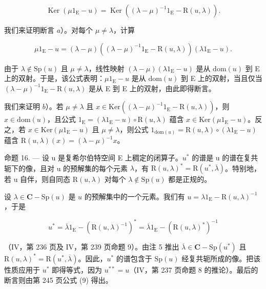 \[
\operatorname{Ker} \left(\mu 1 _ {\mathrm{E}} - u\right) = \operatorname{Ker} \left(\left(\lambda - \mu\right) ^ {- 1} 1 _ {\mathrm{E}} - \mathrm{R} (u, \lambda)\right).
\]

我们来证明断言 \(a\)）。对每个 \(\mu \neq \lambda\)，计算

\[
\mu 1 _ {\mathrm{E}} - u = (\lambda - \mu) ((\lambda - \mu) ^ {- 1} 1 _ {\mathrm{E}} - \mathrm{R} (u, \lambda)) (\lambda 1 _ {\mathrm{E}} - u).
\]

由于 \(\lambda \notin \mathrm{Sp}(u)\) 且 \(\mu \neq \lambda\)，线性映射 \((\lambda - \mu)(\lambda 1_{\mathrm{E}} - u)\) 是从 \(\mathrm{dom}(u)\) 到 E 上的双射。于是，该公式表明：\(\mu 1_{\mathrm{E}} - u\) 是从 \(\mathrm{dom}(u)\) 到 E 上的双射，当且仅当 \((\lambda - \mu)^{-1} 1_{\mathrm{E}} - \mathrm{R}(u, \lambda)\) 是从 E 到 E 上的双射，由此即得断言。

我们来证明 \(b\)）。若 \(\mu \neq \lambda\) 且 \(x \in \mathrm{Ker}((\lambda - \mu)^{-1}1_{\mathrm{E}} - \mathrm{R}(u, \lambda))\)，则 \(x \in \mathrm{dom}(u)\)，且公式 \(1_{\mathrm{E}} = (\lambda 1_{\mathrm{E}} - u) \circ \mathrm{R}(u, \lambda)\) 蕴含 \(x \in \mathrm{Ker}(\mu 1_{\mathrm{E}} - u)\)。反之，若 \(x \in \mathrm{Ker}(\mu 1_{\mathrm{E}} - u)\) 且 \(\mu \neq \lambda\)，则公式 \(1_{\mathrm{dom}(u)} = \mathrm{R}(u, \lambda) \circ (\lambda 1_{\mathrm{E}} - u)\) 蕴含 \(\mathrm{R}(u, \lambda)(x) = (\lambda - \mu)^{-1}x\)。

命题 16. --- 设 u 是复希尔伯特空间 E 上稠定的闭算子。\(u^{*}\) 的谱是 u 的谱在复共轭下的像，且对 u 的预解集的每个元素 \(\lambda\)，有 \(\mathrm{R}(u,\lambda)^{*}=\mathrm{R}(u^{*},\overline{\lambda})\)。特别地，若 u 自伴，则自同态 \(\mathrm{R}(u,\lambda)\) 对每个 \(\lambda\notin\mathrm{Sp}(u)\) 都是正规的。

设 \(\lambda\in\mathbf{C} - \mathrm{Sp}(u)\) 是 \(u\) 的预解集中的一个元素。我们有 \(u=\lambda1_{\mathrm{E}}-\mathrm{R}(u,\lambda)^{-1}\)，于是

\[
u ^ {*} = \overline {{\lambda}} 1 _ {\mathrm{E}} - (\mathrm{R} (u, \lambda) ^ {- 1}) ^ {*} = \overline {{\lambda}} 1 _ {\mathrm{E}} - (\mathrm{R} (u, \lambda) ^ {*}) ^ {- 1}
\]

（IV，第 236 页及 IV，第 239 页命题 9）。由注 5 推出 \(\overline{\lambda} \in \mathbf{C} - \mathrm{Sp}(u^{*})\) 且 \(\mathrm{R}(u, \lambda)^{*} = \mathrm{R}(u^{*}, \overline{\lambda})\)。因此，\(u^{*}\) 的谱包含于 \(\mathrm{Sp}(u)\) 经复共轭所成的像。把该性质应用于 \(u^{*}\) 即得等式，因为 \(u^{**} = u\)（IV，第 237 页命题 8 的推论）。最后的断言则由第 245 页公式 (9) 得出。

